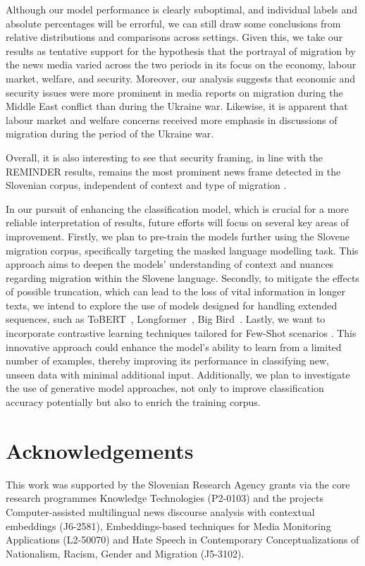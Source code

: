 \documentclass[10pt, a4paper]{article}
\begin{document}
Although our model performance is clearly suboptimal, and individual labels and absolute percentages will be errorful, we can still draw some conclusions from relative distributions and comparisons across settings. Given this, we take our results as tentative support for the hypothesis that the portrayal of migration by the news media varied across the two periods in its focus on the economy, labour market, welfare, and security. Moreover, our analysis suggests that economic and security issues were more prominent in media reports on migration during the Middle East conflict than during the Ukraine war.
Likewise, it is apparent that labour market and welfare concerns received more emphasis in discussions of migration during the period of the Ukraine war. 


Overall, it is also interesting to see that security framing, in line with the REMINDER results, remains the most prominent news frame detected in the Slovenian corpus, independent of context and type of migration \citep{stormback_2021}.


In our pursuit of enhancing the classification model, which is crucial for a more reliable interpretation of results, future efforts will focus on several key areas of improvement.  
Firstly,  we plan to pre-train the models further using the Slovene migration corpus, specifically targeting the masked language modelling task. 
This approach aims to deepen the models' understanding of context and nuances regarding migration within the Slovene language. 
Secondly, to mitigate the effects of possible truncation, which can lead to the loss of vital information in longer texts, we intend to explore the use of models designed for handling extended sequences, such as ToBERT~\citep{pappagari2019hierarchical}, Longformer~\citep{beltagy2020longformer}, Big Bird~\citep{zaheer2021big}. Lastly, we want to incorporate contrastive learning techniques tailored for Few-Shot scenarios \citep{reiter-haas-etal-2023-mcpt, liao-etal-2023-marseclipse}. 
This innovative approach could enhance the model's ability to learn from a limited number of examples, thereby improving its performance in classifying new, unseen data with minimal additional input.
Additionally, we plan to investigate the use of generative model approaches, not only to improve classification accuracy potentially but also to enrich the training corpus. 

\section{Acknowledgements}
This work was supported by the Slovenian Research Agency grants via the core research programmes Knowledge Technologies (P2-0103) and the projects Computer-assisted multilingual news discourse analysis with contextual embeddings (J6-2581), Embeddings-based techniques for Media Monitoring Applications (L2-50070) and Hate Speech in Contemporary Conceptualizations of Nationalism, Racism, Gender and Migration (J5-3102). 
\end{document}
